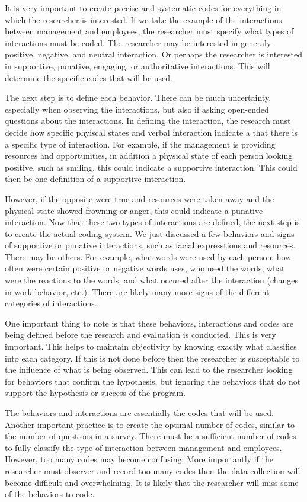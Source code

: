 \documentclass[]{book}
\theoremstyle{definition}
\theoremstyle{definition}
\theoremstyle{definition}
\theoremstyle{remark}
\begin{document}
It is very important to create precise and systematic codes for
everything in which the researcher is interested. If we take the example
of the interactions between management and employees, the researcher
must specify what types of interactions must be coded. The researcher
may be interested in generaly positive, negative, and neutral
interaction. Or perhaps the researcher is interested in supportive,
punative, engaging, or authoritative interactions. This will determine
the specific codes that will be used.

The next step is to define each behavior. There can be much uncertainty,
especially when observing the interactions, but also if asking
open-ended questions about the interactions. In defining the
interaction, the research must decide how specific phyiscal states and
verbal interaction indicate a that there is a specific type of
interaction. For example, if the management is providing resources and
opportunities, in addition a physical state of each person looking
positive, such as smiling, this could indicate a supportive interaction.
This could then be one definition of a supportive interaction.

However, if the opposite were true and resources were taken away and the
physical state showed frowning or anger, this could indicate a punative
interaction. Now that these two types of interactions are defined, the
next step is to create the actual coding system. We just discussed a few
behaviors and signs of supportive or punative interactions, such as
facial expresstions and resources. There may be others. For example,
what words were used by each person, how often were certain positive or
negative words uses, who used the words, what were the reactions to the
words, and what occured after the interaction (changes in work behavior,
etc.). There are likely many more signs of the different categories of
interactions.

One important thing to note is that these behaviors, interactions and
codes are being defined before the research and evaluation is conducted.
This is very important. This helps to maintain objectivity by knowing
exactly what classifies into each category. If this is not done before
then the researcher is susceptable to the influence of what is being
observed. This can lead to the researcher looking for behaviors that
confirm the hypothesis, but ignoring the behaviors that do not support
the hypothesis or success of the program.

The behaviors and interactions are essentially the codes that will be
used. Another important practice is to create the optimal number of
codes, similar to the number of questions in a survey. There must be a
sufficient number of codes to fully classify the type of interaction
between management and employees. However, too many codes may become
confusing. More importantly if the researcher must observer and record
too many codes then the data collection will become difficult and
overwhelming. It is likely that the researcher will miss some of the
behaviors to code.
\end{document}
